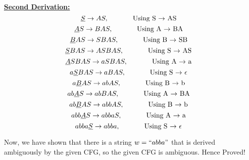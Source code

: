 \documentclass[a4paper]{exam}
\begin{document}
\begin{questions}
\begin{solution}
\underline{\textbf{Second Derivation:}}
\[ \underline{S} \to AS , \text{ \hspace{1cm} Using S $\to$ AS}\]
\[ \underline{A} S \to BAS , \text{ \hspace{1cm} Using A $\to$ BA}\]
\[ \underline{B}AS \to SBAS , \text{ \hspace{1cm} Using B $\to$ SB}\]
\[ \underline{S} BAS \to ASBAS , \text{ \hspace{1cm} Using S $\to$ AS}\]
\[ \underline{A} SBAS \to aSBAS , \text{ \hspace{1cm} Using A $\to$ a}\]
\[ a\underline{S}BAS \to aBAS , \text{ \hspace{1cm} Using S $\to$ $\epsilon$}\]
\[ a\underline{B}AS \to abAS , \text{ \hspace{1cm} Using B $\to$ b}\]
\[ ab\underline{A}S \to abBAS , \text{ \hspace{1cm} Using A $\to$ BA}\]
\[ ab\underline{B}AS \to abbAS , \text{ \hspace{1cm} Using B $\to$ b}\]
\[ abb\underline{A}S \to abbaS , \text{ \hspace{1cm} Using A $\to$ a}\]
\[ abba\underline{S} \to abba, \text{ \hspace{1cm} Using S $\to$ $\epsilon$}\]

Now, we have shown that there is a string $w = ``abba"$ that is derived ambiguously by the given CFG, so the given CFG is ambiguous. Hence Proved!
  \end{solution}
\end{questions}
\end{document}
